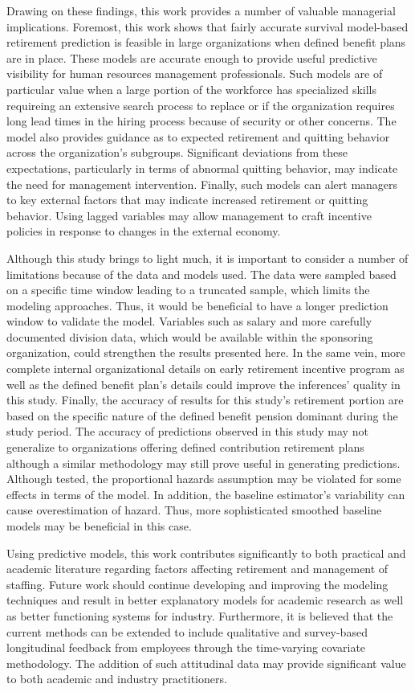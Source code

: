 Drawing on these findings, this work provides a number of valuable managerial implications. Foremost, this work shows that fairly accurate survival model-based retirement prediction is feasible in large organizations when defined benefit plans are in place. These models are accurate enough to provide useful predictive visibility for human resources management professionals. Such models are of particular value when a large portion of the workforce has specialized skills requireing an extensive search process to replace or if the organization requires long lead times in the hiring process because of security or other concerns. The model also provides guidance as to expected retirement and quitting behavior across the organization's subgroups.  Significant deviations from these expectations, particularly in terms of abnormal quitting behavior, may indicate the need for management intervention. Finally, such models can alert managers to key external factors that may indicate increased retirement or quitting behavior. Using lagged variables may allow management to craft incentive policies in response to changes in the external economy.

Although this study brings to light much, it is important to consider a number of limitations because of the data and models used. The data were sampled based on a specific time window leading to a truncated sample, which limits the modeling approaches. Thus, it would be beneficial to have a longer prediction window to validate the model. Variables such as salary and more carefully documented division data, which would be available within the sponsoring organization, could strengthen the results presented here. In the same vein, more complete internal organizational details on early retirement incentive program as well as the defined benefit plan's details could improve the inferences' quality in this study. Finally, the accuracy of results for this study's retirement portion are based on the specific nature of the defined benefit pension dominant during the study period. The accuracy of predictions observed in this study may not generalize to organizations offering defined contribution retirement plans although a similar methodology may still prove useful in generating predictions. Although tested, the proportional hazards assumption may be violated for some effects in terms of the model. In addition, the baseline estimator's variability can cause overestimation of hazard. Thus, more sophisticated smoothed baseline models may be beneficial in this case.

Using predictive models, this work contributes significantly to both practical and academic literature regarding factors affecting retirement and management of staffing.  Future work should continue developing and improving the modeling techniques and result in better explanatory models for academic research as well as better functioning systems for industry. Furthermore, it is believed that the current methods can be extended to include qualitative and survey-based longitudinal feedback from employees through the time-varying covariate methodology. The addition of such attitudinal data may provide significant value to both academic and industry practitioners.
